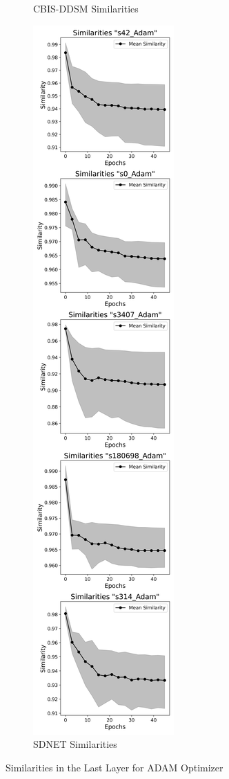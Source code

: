 \begin{figure}[h!]
\begin{subfigure}[b]{0.3\textwidth}
        \caption{CBIS-DDSM Similarities}
        \label{fig:cbisddsm_adam}
      \end{subfigure}
      \hfill
      \begin{subfigure}[b]{0.3\textwidth}
        \includegraphics[width=\textwidth]{figures/crack_similarities_Adam_V2.png}
        \caption{SDNET Similarities}
        \label{fig:sdnet_adam}
      \end{subfigure}
      \caption{Similarities in the Last Layer for ADAM Optimizer}
      \label{fig:similarities_adam}
\end{figure}



